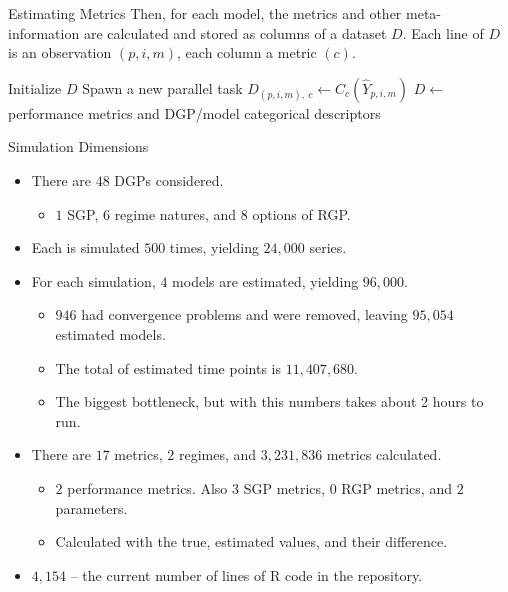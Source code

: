 \documentclass[
  ignorenonframetext,
]{beamer}
\providecommand{\tightlist}{%
  \setlength{\itemsep}{0pt}\setlength{\parskip}{0pt}}\usepackage{longtable,booktabs,array}
\begin{document}
\begin{frame}{Estimating Metrics}
\label{estimating-metrics}
Then, for each model, the metrics and other meta-information are
calculated and stored as columns of a dataset \(D\). Each line of \(D\)
is an observation \((p, i, m)\), each column a metric \((c)\).

\begin{algorithm}[H]
\begin{algorithmic}[1]
    \State Initialize $D$
        \State Spawn a new parallel task
            \State $D_{(p, i, m),~ c} \gets C_c(\hat{Y}_{p, i, m})$
        \EndFor
        \State $D \gets$ performance metrics and DGP/model categorical descriptors
    \EndFor
\end{algorithmic}
\end{algorithm}
\end{frame}

\begin{frame}{Simulation Dimensions}
\label{simulation-dimensions}
\begin{itemize}
\tightlist
\item
  There are \(48\) DGPs considered.

  \begin{itemize}
  \tightlist
  \item
    \(1\) SGP, \(6\) regime natures, and \(8\) options of RGP.
  \end{itemize}
\item
  Each is simulated \(500\) times, yielding \(24,000\) series.
\item
  For each simulation, \(4\) models are estimated, yielding \(96,000\).

  \begin{itemize}
  \tightlist
  \item
    \(946\) had convergence problems and were removed, leaving
    \(95,054\) estimated models.
  \item
    The total of estimated time points is \(11,407,680\).
  \item
    The biggest bottleneck, but with this numbers takes about 2 hours to
    run.
  \end{itemize}
\item
  There are \(17\) metrics, \(2\) regimes, and \(3,231,836\) metrics
  calculated.

  \begin{itemize}
  \tightlist
  \item
    \(2\) performance metrics. Also \(3\) SGP metrics, \(0\) RGP
    metrics, and \(2\) parameters.
  \item
    Calculated with the true, estimated values, and their difference.
  \end{itemize}
\item
  \(4,154\) -- the current number of lines of R code in the repository.
\end{itemize}
\end{frame}
\end{document}
